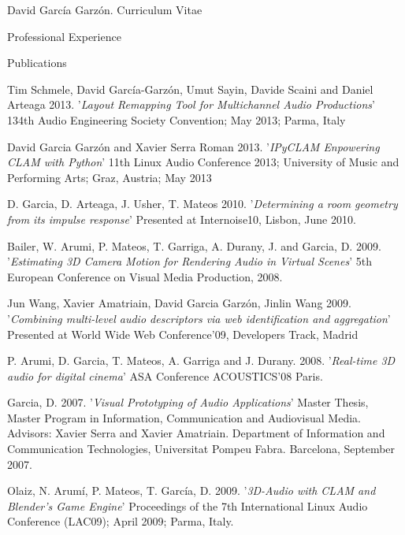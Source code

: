 \documentclass{article}
\begin{document}
\begin{cv}{David García Garzón. Curriculum Vitae}
\begin{cvlist}{Professional Experience}
	
\end{cvlist}

\begin{cvlist}{Publications}

\item[] {\sc Tim Schmele, David García-Garzón, Umut Sayin, Davide Scaini and Daniel Arteaga} 2013.
'{\em Layout Remapping Tool for Multichannel Audio Productions}'
134th Audio Engineering Society Convention; May 2013; Parma, Italy

\item[] {\sc David Garcia Garzón and Xavier Serra Roman} 2013.
'{\em IPyCLAM Enpowering CLAM with Python}'
11th Linux Audio Conference 2013; University of Music and Performing Arts; Graz, Austria; May 2013

\item[] {\sc D. Garcia, D. Arteaga,  J.  Usher, T. Mateos} 2010.
'{\em Determining a room geometry from its impulse response}'
Presented at Internoise10, Lisbon, June 2010.

\item[] {\sc Bailer, W. Arumi, P. Mateos, T. Garriga, A. Durany, J. and Garcia, D.} 2009.
'{\em Estimating 3D Camera Motion for Rendering Audio in Virtual Scenes}'
5th European Conference on Visual Media Production, 2008.

\item[] {\sc Jun Wang, Xavier Amatriain, David Garcia Garzón, Jinlin Wang} 2009.
'{\em Combining multi-level audio descriptors via web identification and aggregation}'
Presented at World Wide Web Conference'09, Developers Track, Madrid

\item[] {\sc P. Arumi, D. Garcia, T. Mateos, A. Garriga and J. Durany.} 2008.
'{\em Real-time 3D audio for digital cinema}'
ASA Conference ACOUSTICS'08 Paris.

\item[] {\sc Garcia, D.} 2007.
'{\em Visual Prototyping of Audio Applications}'
Master Thesis, Master Program in Information, Communication and Audiovisual Media. Advisors: Xavier Serra and Xavier Amatriain. Department of Information and Communication Technologies, Universitat Pompeu Fabra. Barcelona, September 2007.

\item[] {\sc Olaiz, N. Arumí, P. Mateos, T. García, D.} 2009.
'{\em 3D-Audio with CLAM and Blender's Game Engine}'
Proceedings of the 7th International Linux Audio Conference (LAC09); April 2009; Parma, Italy.


\end{cvlist}
\end{cv}
\end{document}

